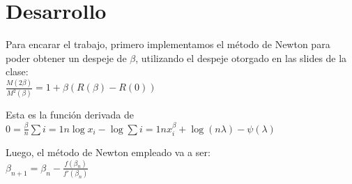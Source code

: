 \section{Desarrollo}
Para encarar el trabajo, primero implementamos el m\'etodo de Newton para poder obtener un despeje de $\beta$, utilizando el despeje otorgado en las slides de la clase:\\

$\frac{M(2\beta)}{M^2(\beta)}=1 + \beta(R(\beta)-R(0))$

Esta es la funci\'on derivada de \\

$0 = \frac{\beta}{n}\sum{i=1}{n}\log x_i - \log \sum{i=1}{n}x_i^{\beta} + \log(n\lambda)-\psi(\lambda)$

Luego, el m\'etodo de Newton empleado va a ser: \\

$\beta_{n+1} = \beta_{n} - \frac{f(\beta_{n})}{f'(\beta_{n})}$
